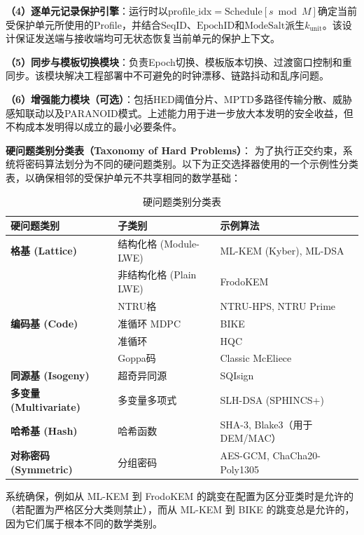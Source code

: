 ﻿\documentclass[12pt,a4paper]{article}
\begin{document}
\textbf{（4）逐单元记录保护引擎}：运行时以$\text{profile\_idx}=\text{Schedule}[s \bmod M]$确定当前受保护单元所使用的Profile，并结合$\text{SeqID}$、$\text{EpochID}$和$\text{ModeSalt}$派生$k_{\text{unit}}$。该设计保证发送端与接收端均可无状态恢复当前单元的保护上下文。

\textbf{（5）同步与模板切换模块}：负责Epoch切换、模板版本切换、过渡窗口控制和重同步。该模块解决工程部署中不可避免的时钟漂移、链路抖动和乱序问题。

\textbf{（6）增强能力模块（可选）}：包括HED阈值分片、MPTD多路径传输分散、威胁感知联动以及PARANOID模式。上述能力用于进一步放大本发明的安全收益，但不构成本发明得以成立的最小必要条件。

\textbf{硬问题类别分类表（Taxonomy of Hard Problems）}：
为了执行正交约束，系统将密码算法划分为不同的硬问题类别。以下为正交选择器使用的一个示例性分类表，以确保相邻的受保护单元不共享相同的数学基础：
\begin{table}[H]
\centering
\small
\setlength{\tabcolsep}{4pt}
\begin{tabular}{|>{\raggedright\arraybackslash}p{2.6cm}|>{\raggedright\arraybackslash}p{3.2cm}|>{\raggedright\arraybackslash}p{6.4cm}|}
\hline
\textbf{硬问题类别} & \textbf{子类别} & \textbf{示例算法} \\ \hline
\textbf{格基 (Lattice)} & 结构化格 (Module-LWE) & ML-KEM (Kyber), ML-DSA \\ \cline{2-3}
 & 非结构化格 (Plain LWE) & FrodoKEM \\ \cline{2-3}
 & NTRU格 & NTRU-HPS, NTRU Prime \\ \hline
\textbf{编码基 (Code)} & 准循环 MDPC & BIKE \\ \cline{2-3}
 & 准循环 & HQC \\ \cline{2-3}
 & Goppa码 & Classic McEliece \\ \hline
\textbf{同源基 (Isogeny)} & 超奇异同源 & SQIsign \\ \hline
\textbf{多变量 (Multivariate)} & 多变量多项式 & SLH-DSA (SPHINCS+) \\ \hline
\textbf{哈希基 (Hash)} & 哈希函数 & SHA-3, Blake3（用于DEM/MAC） \\ \hline
\textbf{对称密码 (Symmetric)} & 分组密码 & AES-GCM, ChaCha20-Poly1305 \\ \hline
\end{tabular}
\caption{硬问题类别分类表}
\end{table}
系统确保，例如从 ML-KEM 到 FrodoKEM 的跳变在配置为区分亚类时是允许的（若配置为严格区分大类则禁止），而从 ML-KEM 到 BIKE 的跳变总是允许的，因为它们属于根本不同的数学类别。
\end{document}
